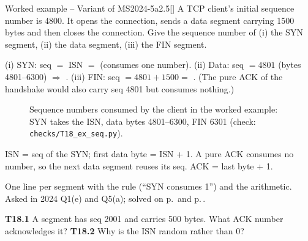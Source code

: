 \begin{question}{Worked example -- Variant of MS2024-5a}{2.5}[]
A TCP client's initial sequence number is 4800. It opens the connection, sends a data segment carrying 1500 bytes and then closes the
connection. Give the sequence number of (i) the SYN segment, (ii) the data segment, (iii) the FIN segment.
\end{question}
\begin{solution}
(i) SYN: seq $=$ ISN $=$  (consumes one number).\quad
(ii) Data: seq $=4801$ (bytes 4801--6300) $\Rightarrow$ .\quad
(iii) FIN: seq $=4801+1500=$ .
(The pure ACK of the handshake would also carry seq 4801 but consumes nothing.)
\end{solution}

\begin{figure}[H]\centering
{}
\caption{Sequence numbers consumed by the client in the worked example: SYN takes the ISN, data bytes 4801--6300, FIN 6301 (check: \texttt{checks/T18\_ex\_seq.py}).}
\end{figure}

\begin{warningbox}
ISN = seq of the SYN; first data byte = ISN + 1. A pure ACK consumes no number, so the next data segment reuses its seq. ACK = last byte + 1.
\end{warningbox}

\begin{answerplan}[1--2.5 marks]
One line per segment with the rule (``SYN consumes 1'') and the arithmetic. Asked in 2024 Q1(e) and Q5(a); solved on p.\,\pageref{q:MS2024-1e} and p.\,\pageref{q:MS2024-5a}.
\par{} \textbf{T18.1} A segment has seq 2001 and carries 500 bytes. What ACK number acknowledges it?\quad
\textbf{T18.2} Why is the ISN random rather than 0?
\end{answerplan}

